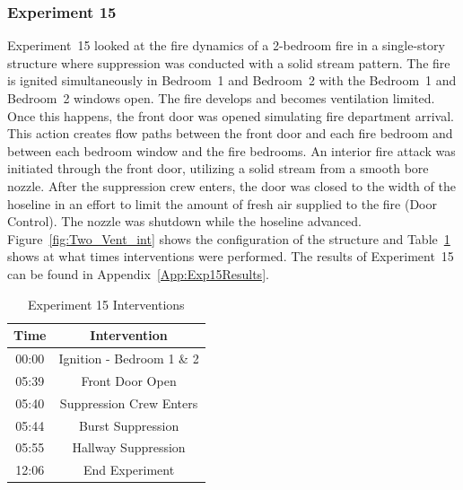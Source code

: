\documentclass[12pt,oneside]{book}
\begin{document}
\subsubsection{Experiment 15}
Experiment~15 looked at the fire dynamics of a 2-bedroom fire in a single-story structure where suppression was conducted with a solid stream pattern. The fire is ignited simultaneously in Bedroom~1 and Bedroom~2 with the Bedroom~1 and Bedroom~2 windows open. The fire develops and becomes ventilation limited. Once this happens, the front door was opened simulating fire department arrival. This action creates flow paths between the front door and each fire bedroom and between each bedroom window and the fire bedrooms. An interior fire attack was initiated through the front door, utilizing a solid stream from a smooth bore nozzle. After the suppression crew enters, the door was closed to the width of the hoseline in an effort to limit the amount of fresh air supplied to the fire (Door Control). The nozzle was shutdown while the hoseline advanced. Figure~\ref{fig:Two_Vent_int} shows the configuration of the structure and Table~\ref{Table:Exp15Interventions} shows at what times interventions were performed. The results of Experiment~15 can be found in Appendix~\ref{App:Exp15Results}. 


\begin{table}[H]
	\centering
	\caption{Experiment 15 Interventions}
	\begin{tabular}{|c|c|} 
		\hline
		Time & Intervention \\ \hline \hline
		00:00 & Ignition - Bedroom 1 \& 2 \\ \hline
		05:39 & Front Door Open \\ \hline
		05:40 & Suppression Crew Enters\\ \hline
		05:44 & Burst Suppression \\ \hline 
		05:55 & Hallway Suppression \\ \hline
		12:06 & End Experiment\\ \hline
	\end{tabular}
	\label{Table:Exp15Interventions}
\end{table}

\FloatBarrier
\end{document}
